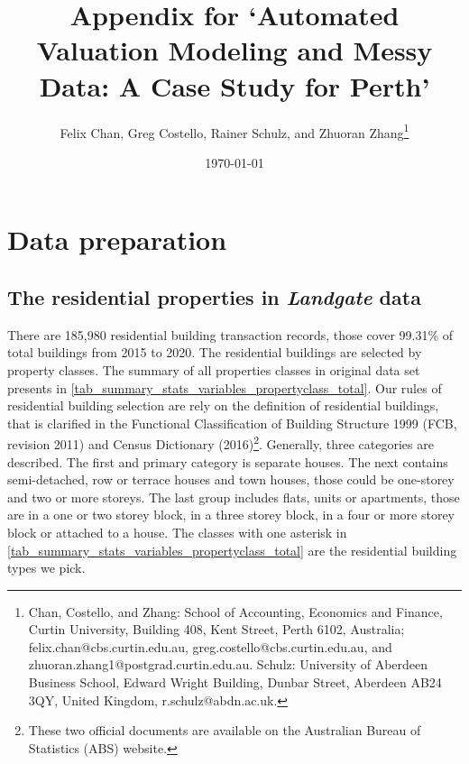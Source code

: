 \documentclass[12pt,a4paper]{article}
\begin{document}
\title{Appendix for `Automated Valuation Modeling and Messy Data: A Case Study for Perth'}

\author{Felix Chan, Greg Costello, Rainer Schulz, and Zhuoran Zhang\thanks{Chan, Costello, and Zhang: School of Accounting, Economics and Finance, Curtin University, Building 408, Kent Street, Perth 6102, Australia; {felix.chan@cbs.curtin.edu.au}, {greg.costello@cbs.curtin.edu.au}, and {zhuoran.zhang1@postgrad.curtin.edu.au}. Schulz: University of Aberdeen Business School, Edward Wright Building, Dunbar Street, Aberdeen AB24 3QY, United Kingdom, {r.schulz@abdn.ac.uk}.\setlength{\baselineskip}{1.25em}}}

\date{\today}

\maketitle

\newpage
\tableofcontents

\newpage
\appendix

\section{Data preparation}

\subsection{The residential properties in \textit{Landgate} data}

There are 185,980 residential building transaction records, those cover 99.31\% of total buildings from 2015 to 2020. The residential buildings are selected by property classes. The summary of all properties classes in original data set presents in \autoref{tab_summary_stats_variables_propertyclass_total}. Our rules of residential building selection are rely on the definition of residential buildings, that is clarified in the Functional Classification of Building Structure 1999 (FCB, revision 2011) and Census Dictionary (2016)\footnote{These two official documents are available on the Australian Bureau of Statistics (ABS) website.}. Generally, three categories are described. The first and primary category is separate houses. The next contains semi-detached, row or terrace houses and town houses, those could be one-storey and two or more storeys. The last group includes flats, units or apartments, those are in a one or two storey block, in a three storey block, in a four or more storey block or attached to a house. The classes with one asterisk in \autoref{tab_summary_stats_variables_propertyclass_total} are the residential building types we pick.
\end{document}
